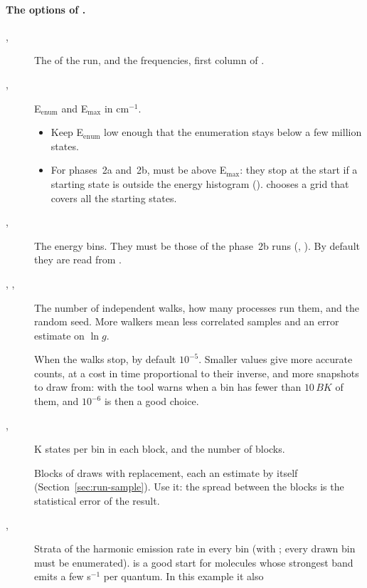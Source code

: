 \paragraph{The options of .}
\begin{description}
\item[, ] The  of the run, and the
frequencies, first column of .
\item[, ] E$_\mathrm{enum}$ and E$_\mathrm{max}$ in
cm$^{-1}$.
\begin{itemize}
\item Keep E$_\mathrm{enum}$ low enough that the enumeration stays below
a few million states.
\item For phases~2a and~2b,  must be above E$_\mathrm{max}$:
they stop at the start if a starting state is outside the energy
histogram ().  chooses a grid
that covers all the starting states.
\end{itemize}
\item[, ] The energy bins. They must be
those of the phase~2b runs (, ). By default
they are read from .
\item[, , ] The number of
independent walks, how many processes run them, and the random seed.
More walkers mean less correlated samples and an error estimate on
$\ln g$.
\item[] When the walks stop, by default $10^{-5}$.
Smaller values give more accurate counts, at a cost in time proportional
to their inverse, and more snapshots to draw from: with 
the tool warns when a bin has fewer than $10\,BK$ of them, and
$10^{-6}$ is then a good choice.
\item[, ] K states per bin in each block, and
the number of blocks.
\item[] Blocks of draws with replacement, each an estimate
by itself (Section~\ref{sec:run-sample}). Use it: the spread between the
blocks is the statistical error of the result.
\item[, ] Strata of the harmonic
emission rate in every bin (with ; every drawn bin must be
enumerated).  is a good start for molecules whose
strongest band emits a few s$^{-1}$ per quantum. In this example it also

\end{description}
